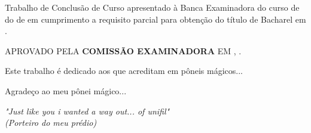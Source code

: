 \documentclass[12pt,openright,oneside,a4paper,english,french,spanish,brazil]{unifil}
\begin{document}
\begin{folhadeaprovacao}
	\begin{center}
		\ABNTEXchapterfont\textbf{\MakeTextUppercase{\imprimirautor}}
		\vspace*{2cm}
		\begin{center}
			\ABNTEXchapterfont\large\textbf{\MakeTextUppercase{\imprimirtitulo}}
		\end{center}
		\vspace*{2cm}
		Trabalho de Conclusão de Curso apresentado à Banca Examinadora do curso de \imprimirpreambulo do \imprimirinstituicao de \imprimirlocal em cumprimento a requisito parcial para obtenção do título de Bacharel em \imprimirpreambulo.
		\par
		\vspace*{.5in}
		\hspace{.6\textwidth}
		\begin{minipage}{.6\textwidth}
			\begin{center}
\MakeTextUppercase{Aprovado pela \textbf{COMISSÃO EXAMINADORA} em \imprimirlocal, \imprimirdata.}
			\end{center}
		\end{minipage}
			\vspace*{\fill}
	\end{center}
\end{folhadeaprovacao}


\begin{epigrafe}
\vspace*{\fill}
\begin{flushright}
Este trabalho é dedicado aos que acreditam em pôneis mágicos...
\end{flushright}
\end{epigrafe}


\begin{agradecimentos}

Agradeço ao meu pônei mágico...
\end{agradecimentos}



\begin{epigrafe}
\vspace*{\fill}
\begin{flushright}
\textit{"Just like you i wanted a way out... of unifil" \\
(Porteiro do meu prédio)}
\end{flushright}
\end{epigrafe}
\end{document}
